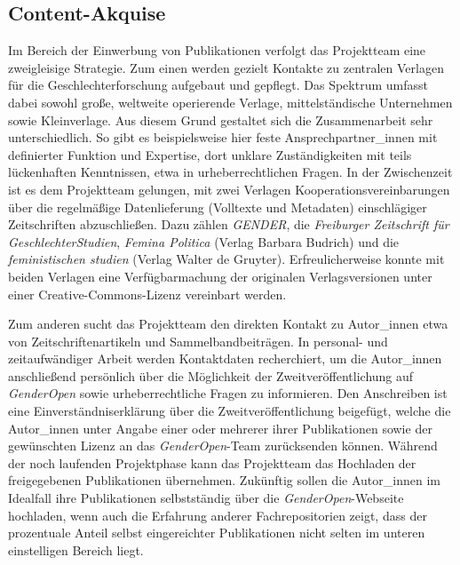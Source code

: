 \documentclass[a4paper,
fontsize=11pt,
oneside,
numbers=noperiodatend,
parskip=half-,
bibliography=totoc,
final
]{scrartcl}
\begin{document}
\hypertarget{content-akquise}{%
\subsection{Content-Akquise}\label{content-akquise}}

Im Bereich der Einwerbung von Publikationen verfolgt das Projektteam
eine zweigleisige Strategie. Zum einen werden gezielt Kontakte zu
zentralen Verlagen für die Geschlechterforschung aufgebaut und gepflegt.
Das Spektrum umfasst dabei sowohl große, weltweite operierende Verlage,
mittelständische Unternehmen sowie Kleinverlage. Aus diesem Grund
gestaltet sich die Zusammenarbeit sehr unterschiedlich. So gibt es
beispielsweise hier feste Ansprechpartner\_innen mit definierter
Funktion und Expertise, dort unklare Zuständigkeiten mit teils
lückenhaften Kenntnissen, etwa in urheberrechtlichen Fragen. In der
Zwischenzeit ist es dem Projektteam gelungen, mit zwei Verlagen
Kooperationsvereinbarungen über die regelmäßige Datenlieferung
(Volltexte und Metadaten) einschlägiger Zeitschriften abzuschließen.
Dazu zählen \emph{GENDER}, die \emph{Freiburger Zeitschrift für
GeschlechterStudien}, \emph{Femina Politica} (Verlag Barbara Budrich)
und die \emph{feministischen studien} (Verlag Walter de Gruyter).
Erfreulicherweise konnte mit beiden Verlagen eine Verfügbarmachung der
originalen Verlagsversionen unter einer Creative-Commons-Lizenz
vereinbart werden.

Zum anderen sucht das Projektteam den direkten Kontakt zu Autor\_innen
etwa von Zeitschriftenartikeln und Sammelbandbeiträgen. In personal- und
zeitaufwändiger Arbeit werden Kontaktdaten recherchiert, um die
Autor\_innen anschließend persönlich über die Möglichkeit der
Zweitveröffentlichung auf \emph{GenderOpen} sowie urheberrechtliche
Fragen zu informieren. Den Anschreiben ist eine Einverständniserklärung
über die Zweitveröffentlichung beigefügt, welche die Autor\_innen unter
Angabe einer oder mehrerer ihrer Publikationen sowie der gewünschten
Lizenz an das \emph{GenderOpen}-Team zurücksenden können. Während der
noch laufenden Projektphase kann das Projektteam das Hochladen der
freigegebenen Publikationen übernehmen. Zukünftig sollen die
Autor\_innen im Idealfall ihre Publikationen selbstständig über die
\emph{GenderOpen}-Webseite hochladen, wenn auch die Erfahrung anderer
Fachrepositorien zeigt, dass der prozentuale Anteil selbst eingereichter
Publikationen nicht selten im unteren einstelligen Bereich liegt.
\end{document}
